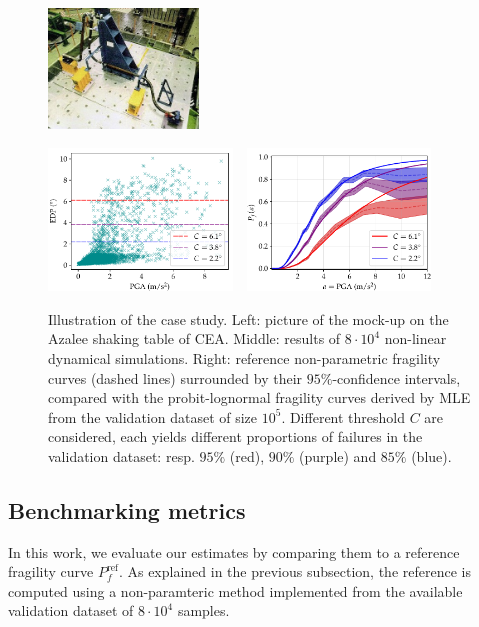 \begin{figure}[h]
    \centering
    \parbox[b][3.8cm][c]{4.5cm}{%
    \includegraphics[height=3.2cm]{figures/intro-frags/ASG.jpg}\vspace*{1em}%
    }
    \includegraphics[height=3.8cm]{figures/intro-frags/asg/cloud_PGA_light.pdf}\ \ 
    \includegraphics[height=3.8cm]{figures/intro-frags/asg/refs_PGA.pdf}
    \caption{Illustration of the case study. Left: picture of the mock-up on the Azalee shaking table of CEA. Middle: results of $8\cdot10^4$ non-linear dynamical simulations. Right: reference non-parametric fragility curves (dashed lines) surrounded by their $95\%$-confidence intervals, compared with the probit-lognormal fragility curves derived by MLE from the validation dataset of size $10^5$. Different threshold $C$ are considered, each yields different proportions of failures in the validation dataset: resp. $95\%$ (red), $90\%$ (purple) and $85\%$ (blue).}
    \label{fig:constr-frag:asg}
\end{figure}



\subsection{Benchmarking metrics}\label{sec:constr-frags:subsec:benchmarking}


In this work, we evaluate our estimates by comparing them to a reference fragility curve $P^{\text{ref}}_f$. As explained in the previous subsection, the reference is computed using a non-paramteric method implemented from the available validation dataset of $8\cdot 10^4$ samples.

